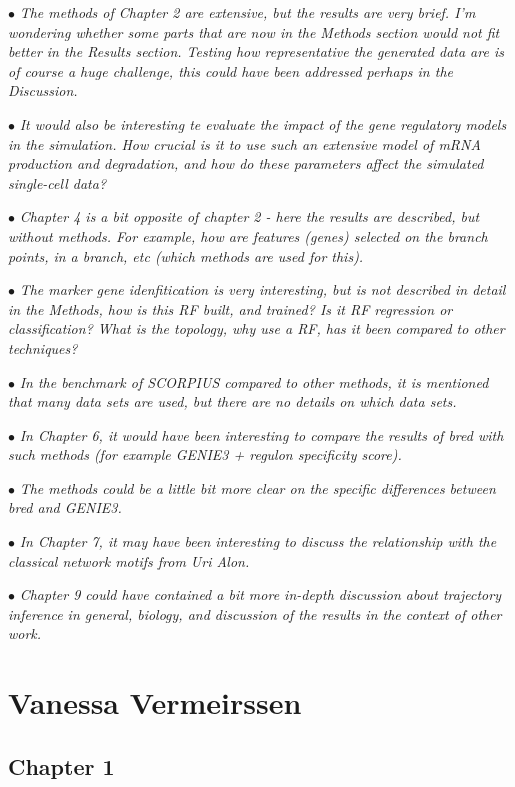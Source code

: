 \documentclass[10pt]{article}
\newcommand{\exam}[2][\  ]{\hspace{0pt}\marginpar{\color{red}#1}$\bullet$ \textit{#2}}
\newcommand{\imp}[1]{{\color{red} #1}}
\newcommand{\bigexclaim}{\raisebox{-0.1em}{\BigTriangleUp}\hspace{-0.32em}\llap{\small\textbf{!}}\hspace{0.32em}}
\newcommand{\tagimp}{\bigexclaim}
\newcommand{\tagtime}{{\Large $\hourglass$}}
\begin{document}
{\exam{The methods of Chapter 2 are extensive, but the results are very brief. I’m wondering whether
some parts that are now in the Methods section would not fit better in the Results section. Testing how
representative the generated data are is of course a huge challenge, this could have been addressed
perhaps in the Discussion.}


\exam[\tagimp \tagtime]{\imp{It would also be interesting te evaluate the impact of the gene regulatory
models in the simulation. How crucial is it to use such an extensive model of mRNA production and
degradation, and how do these parameters affect the simulated single-cell data?}}


\exam{Chapter 4 is a bit opposite
of chapter 2 - here the results are described, but without methods. For example, how are features
(genes) selected on the branch points, in a branch, etc (which methods are used for this).}

\exam{The marker gene idenfitication is very interesting, but is not described in detail in the Methods, how
is this RF built, and trained? Is it RF regression or classification? What is the topology, why use a RF,
has it been compared to other techniques?}

\exam{In the benchmark of SCORPIUS compared to other
methods, it is mentioned that many data sets are used, but there are no details on which data sets.}

 

\exam[\tagimp \tagtime]{\imp{In Chapter 6, it would have been interesting
to compare the results of bred with such methods (for example GENIE3 + regulon specificity score).}}

\exam[\tagimp \tagtime]{\imp{The methods could be a little bit more clear on the specific differences between bred and GENIE3.}}


\exam{In Chapter 7, it may have
been interesting to discuss the relationship with the classical network motifs from Uri Alon.}

\exam{Chapter 9 could have
contained a bit more in-depth discussion about trajectory inference in general, biology, and discussion
of the results in the context of other work.}

 


\section{Vanessa Vermeirssen}


\subsection{Chapter 1}

}
\end{document}
